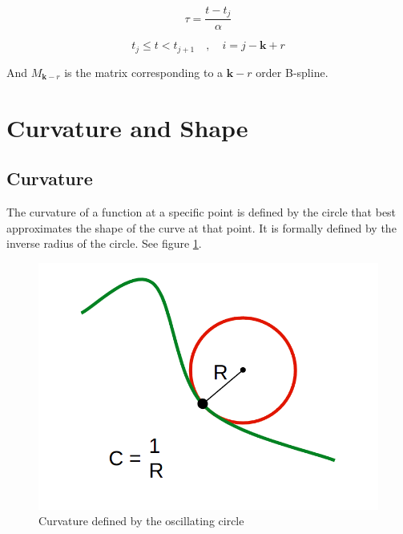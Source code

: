 \documentclass{article}
\begin{document}
    \begin{equation}
        \tau = \frac{t-t_j}{\alpha}
    \end{equation}
    
    \begin{equation}
        t_j \leq t < t_{j+1} \quad , \quad i = j-\textbf{k}+r
    \end{equation}
    
And \(M_{\textbf{k}-r}\) is the matrix corresponding to a \(\textbf{k}-r\) order B-spline. 

  

\section{Curvature and Shape}

\subsection{Curvature}

The curvature of a function at a specific point is defined by the circle that best approximates the shape of the curve at that point. It is formally defined by the inverse radius of the circle. See figure \ref{Fig:Curvature}.

\begin{figure}[H]
\begin{center}
\includegraphics[scale=.2]{Curvature.png}
\end{center}
\caption{Curvature defined by the oscillating circle}
\label{Fig:Curvature}
\end{figure}
\end{document}
